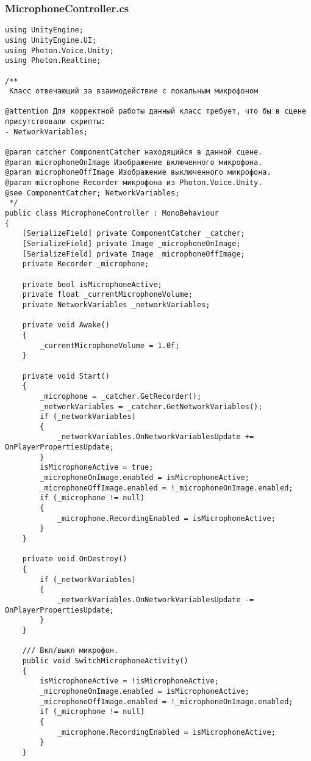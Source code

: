 \subsubsection*{MicrophoneController.cs}
\begin{verbatim}
﻿using UnityEngine;
using UnityEngine.UI;
using Photon.Voice.Unity;
using Photon.Realtime;

/**
 Класс отвечающий за взаимодействие с локальным микрофоном

@attention Для корректной работы данный класс требует, что бы в сцене присутствовали скрипты:
- NetworkVariables;

@param catcher ComponentCatcher находящийся в данной сцене.
@param microphoneOnImage Изображение включенного микрофона.
@param microphoneOffImage Изображение выключенного микрофона.
@param microphone Recorder микрофона из Photon.Voice.Unity.
@see ComponentCatcher; NetworkVariables; 
 */
public class MicrophoneController : MonoBehaviour
{
    [SerializeField] private ComponentCatcher _catcher;
    [SerializeField] private Image _microphoneOnImage;
    [SerializeField] private Image _microphoneOffImage;
    private Recorder _microphone;

    private bool isMicrophoneActive;
    private float _currentMicrophoneVolume;
    private NetworkVariables _networkVariables;

    private void Awake()
    {
        _currentMicrophoneVolume = 1.0f;
    }

    private void Start()
    {
        _microphone = _catcher.GetRecorder();
        _networkVariables = _catcher.GetNetworkVariables();
        if (_networkVariables)
        {
            _networkVariables.OnNetworkVariablesUpdate += OnPlayerPropertiesUpdate;
        }
        isMicrophoneActive = true;
        _microphoneOnImage.enabled = isMicrophoneActive;
        _microphoneOffImage.enabled = !_microphoneOnImage.enabled;
        if (_microphone != null)
        {
            _microphone.RecordingEnabled = isMicrophoneActive;
        }
    }

    private void OnDestroy()
    {
        if (_networkVariables)
        {
            _networkVariables.OnNetworkVariablesUpdate -= OnPlayerPropertiesUpdate;
        }
    }

    /// Вкл/выкл микрофон.
    public void SwitchMicrophoneActivity()
    {
        isMicrophoneActive = !isMicrophoneActive;
        _microphoneOnImage.enabled = isMicrophoneActive;
        _microphoneOffImage.enabled = !_microphoneOnImage.enabled;
        if (_microphone != null)
        {
            _microphone.RecordingEnabled = isMicrophoneActive;
        }
    }


\end{verbatim}
